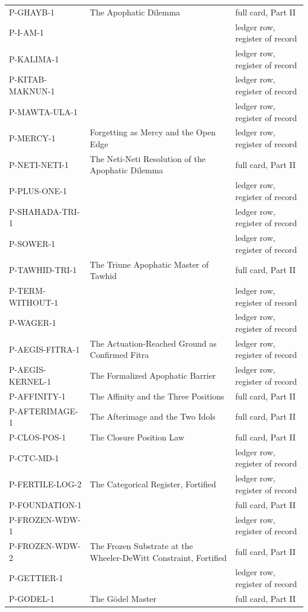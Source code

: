 \documentclass[10pt,twocolumn]{article}
\begin{document}
\begin{center}
\begin{longtable}{>{\raggedright\arraybackslash}p{}>{\raggedright\arraybackslash}p{}>{\raggedright\arraybackslash}p{}}
P-GHAYB-1 & The Apophatic Dilemma & full card, Part II \\
P-I-AM-1 &  & ledger row, register of record \\
P-KALIMA-1 &  & ledger row, register of record \\
P-KITAB-MAKNUN-1 &  & ledger row, register of record \\
P-MAWTA-ULA-1 &  & ledger row, register of record \\
P-MERCY-1 & Forgetting as Mercy and the Open Edge & ledger row, register of record \\
P-NETI-NETI-1 & The Neti-Neti Resolution of the Apophatic Dilemma & full card, Part II \\
P-PLUS-ONE-1 &  & ledger row, register of record \\
P-SHAHADA-TRI-1 &  & ledger row, register of record \\
P-SOWER-1 &  & ledger row, register of record \\
P-TAWHID-TRI-1 & The Triune Apophatic Master of Tawhid & full card, Part II \\
P-TERM-WITHOUT-1 &  & ledger row, register of record \\
P-WAGER-1 &  & ledger row, register of record \\
P-AEGIS-FITRA-1 & The Actuation-Reached Ground as Confirmed Fitra & ledger row, register of record \\
P-AEGIS-KERNEL-1 & The Formalized Apophatic Barrier & ledger row, register of record \\
P-AFFINITY-1 & The Affinity and the Three Positions & full card, Part II \\
P-AFTERIMAGE-1 & The Afterimage and the Two Idols & full card, Part II \\
P-CLOS-POS-1 & The Closure Position Law & full card, Part II \\
P-CTC-MD-1 &  & ledger row, register of record \\
P-FERTILE-LOG-2 & The Categorical Register, Fortified & ledger row, register of record \\
P-FOUNDATION-1 &  & full card, Part II \\
P-FROZEN-WDW-1 &  & ledger row, register of record \\
P-FROZEN-WDW-2 & The Frozen Substrate at the Wheeler-DeWitt Constraint, Fortified & full card, Part II \\
P-GETTIER-1 &  & ledger row, register of record \\
P-GODEL-1 & The Gödel Master & full card, Part II \\

\end{longtable}
\end{center}
\end{document}
